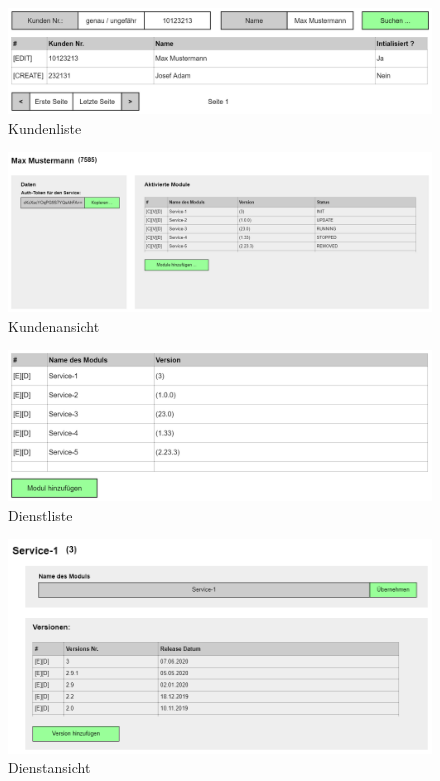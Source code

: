 \begin{center}
    \begin{figure}[H]
        \centering
        \includegraphics[scale=0.3]{content/attachments/k-cus-list.png}
        \caption{Kundenliste}
        \label{fig:k_cus_list}
    \end{figure}
    
    \begin{figure}[H]
        \centering
        \includegraphics[scale=0.3]{content/attachments/k-cus-view.png}
        \caption{Kundenansicht}
        \label{fig:k_cus_view}
    \end{figure}
    
    \begin{figure}[H]
        \centering
        \includegraphics[scale=0.3]{content/attachments/k-ser-list.png}
        \caption{Dienstliste}
        \label{fig:k_ser_list}
    \end{figure}
    
    \begin{figure}[H]
        \centering
        \includegraphics[scale=0.4]{content/attachments/k-ser-view.png}
        \caption{Dienstansicht}
        \label{fig:k_ser_view}
    \end{figure}
    

\end{center}
